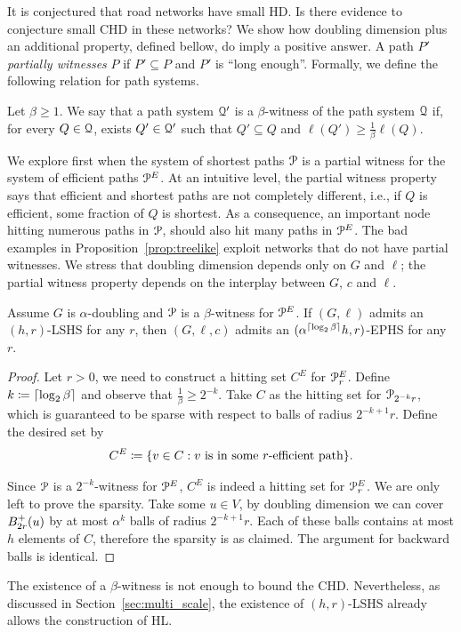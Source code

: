 It is conjectured that road networks have small HD.
Is there evidence to conjecture small CHD in these networks?
We show how doubling dimension plus an additional property, defined bellow, do imply a positive answer.
A path $P'$ \emph{partially witnesses} $P$ if $P'\subseteq P$ and $P'$ is ``long enough''.
Formally, we define the following relation for path systems.

\begin{definition}
Let $\beta\geq 1$.
We say that a path system $\mathcal{Q}'$ is a $\beta$-witness of the path system $\mathcal{Q}$ if, for every $Q\in\mathcal{Q}$, exists $Q'\in\mathcal{Q}'$ such that $Q'\subseteq Q$ and $\ell(Q')\geq \frac{1}{\beta}\ell(Q)$.
\end{definition}

We explore first when the system of shortest paths $\mathcal{P}$ is a partial witness for the system of efficient paths $\mathcal{P}^E$.
At an intuitive level, the partial witness property says that efficient and shortest paths are not completely different, i.e., if $Q$ is efficient, some fraction of $Q$ is shortest.
As a consequence, an important node hitting numerous paths in $\mathcal{P}$, should also hit many paths in $\mathcal{P}^E$.
The bad examples in Proposition~\ref{prop:treelike} exploit networks that do not have partial witnesses.
We stress that doubling dimension depends only on $G$ and $\ell$; the partial witness property depends on the interplay between $G$, $c$ and $\ell$.

\begin{proposition}\label{prop:doubling}
Assume $G$ is $\alpha$-doubling and $\mathcal{P}$ is a $\beta$-witness for $\mathcal{P}^E$.
If $(G,\ell)$ admits an $(h,r)$-LSHS for any $r$, then $(G,\ell,c)$ admits an $(\alpha^{\lceil\log_2\beta\rceil} h,r)$-EPHS for any $r$.
\end{proposition}
\begin{proof}
Let $r>0$, we need to construct a hitting set $C^E$ for $\mathcal{P}_r^E$.
Define $k\coloneqq\lceil\log_2\beta\rceil$ and observe that $\frac{1}{\beta}\geq 2^{-k}$.
Take $C$ as the hitting set for $\mathcal{P}_{2^{-k}r}$, which is guaranteed to be sparse with respect to balls of radius $2^{-k+1}r$.
Define the desired set by
\[
C^E\coloneqq\{v\in C: v \text{ is in some $r$-efficient path} \}.
\]

Since $\mathcal{P}$ is a $2^{-k}$-witness for $\mathcal{P}^E$, $C^E$ is indeed a hitting set for $\mathcal{P}^E_r$.
We are only left to prove the sparsity.
Take some $u\in V$, by doubling dimension we can cover $B^+_{2r}(u)$ by at most $\alpha^k$ balls of radius $2^{-k+1}r$.
Each of these balls contains at most $h$ elements of $C$, therefore the sparsity is as claimed.
The argument for backward balls is identical.
\end{proof}

\begin{remark}
The existence of a $\beta$-witness is not enough to bound the CHD.
Nevertheless, as discussed in Section~\ref{sec:multi_scale}, the existence of $(h,r)$-LSHS already allows the construction of HL.
\end{remark}

